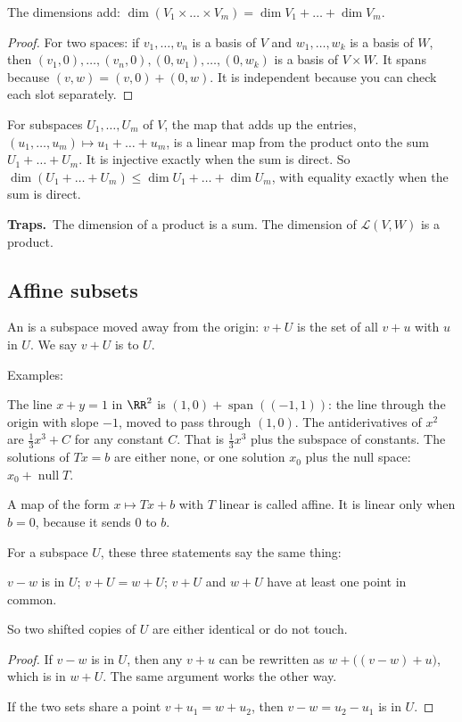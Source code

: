 \documentclass[11pt]{scrartcl}
\DeclareMathOperator{\nul}{null}
\DeclareMathOperator{\spn}{span}
\newcommand{\LL}{\mathcal L}
\newcommand{\traps}{\par\medskip\noindent\textbf{\color{RawSienna}Traps.}\ }
\begin{document}
\begin{proposition*}[Prop.~36]
  The dimensions add: $\dim(V_1\times\dots\times V_m)=\dim V_1+\dots+\dim V_m$.
\end{proposition*}
\begin{proof}
  For two spaces: if $v_1,\dots,v_n$ is a basis of $V$ and $w_1,\dots,w_k$ is a basis of $W$, then
  $(v_1,0),\dots,(v_n,0),(0,w_1),\dots,(0,w_k)$ is a basis of $V\times W$.
  It spans because $(v,w)=(v,0)+(0,w)$. It is independent because you can check each slot separately.
\end{proof}

\begin{proposition*}[Prop.~37]
  For subspaces $U_1,\dots,U_m$ of $V$, the map that adds up the entries, $(u_1,\dots,u_m)\mapsto u_1+\dots+u_m$, is a linear map from the product onto the sum $U_1+\dots+U_m$.
  It is injective exactly when the sum is direct.
  So $\dim(U_1+\dots+U_m)\le\dim U_1+\dots+\dim U_m$, with equality exactly when the sum is direct.
\end{proposition*}

\traps The dimension of a product is a sum. The dimension of $\LL(V,W)$ is a product.

\subsection{Affine subsets}
\begin{definition*}
  An  is a subspace moved away from the origin: $v+U$ is the set of all $v+u$ with $u$ in $U$.
  We say $v+U$ is  to $U$.
\end{definition*}
Examples:
\begin{itemize}
  \ii The line $x+y=1$ in $\RR^2$ is $(1,0)+\spn((-1,1))$: the line through the origin with slope $-1$, moved to pass through $(1,0)$.
  \ii The antiderivatives of $x^2$ are $\tfrac13x^3+C$ for any constant $C$. That is $\tfrac13x^3$ plus the subspace of constants.
  \ii The solutions of $Tx=b$ are either none, or one solution $x_0$ plus the null space: $x_0+\nul T$.
\end{itemize}
A map of the form $x\mapsto Tx+b$ with $T$ linear is called affine. It is linear only when $b=0$, because it sends $0$ to $b$.

\begin{proposition*}[LADR 3.101]
  For a subspace $U$, these three statements say the same thing:
  \begin{enumerate}
    \ii $v-w$ is in $U$;
    \ii $v+U=w+U$;
    \ii $v+U$ and $w+U$ have at least one point in common.
  \end{enumerate}
  So two shifted copies of $U$ are either identical or do not touch.
\end{proposition*}
\begin{proof}
  If $v-w$ is in $U$, then any $v+u$ can be rewritten as $w+\big((v-w)+u\big)$, which is in $w+U$. The same argument works the other way.

  If the two sets share a point $v+u_1=w+u_2$, then $v-w=u_2-u_1$ is in $U$.
\end{proof}
\end{document}
